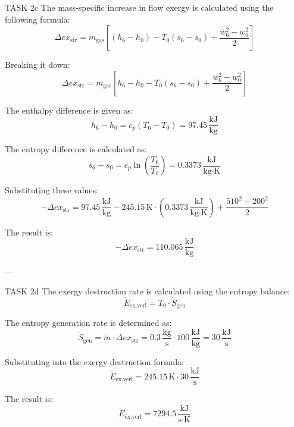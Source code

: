 TASK 2c  
The mass-specific increase in flow exergy is calculated using the following formula:  
\[
\Delta ex_{\text{str}} = \dot{m}_{\text{gas}} \left[ (h_6 - h_0) - T_0 (s_6 - s_0) + \frac{w_6^2 - w_0^2}{2} \right]
\]  

Breaking it down:  
\[
\Delta ex_{\text{str}} = \dot{m}_{\text{gas}} \left[ h_6 - h_0 - T_0 (s_6 - s_0) + \frac{w_6^2 - w_0^2}{2} \right]
\]  

The enthalpy difference is given as:  
\[
h_6 - h_0 = c_p (T_6 - T_0) = 97.45 \, \frac{\text{kJ}}{\text{kg}}
\]  

The entropy difference is calculated as:  
\[
s_6 - s_0 = c_p \ln \left( \frac{T_6}{T_0} \right) = 0.3373 \, \frac{\text{kJ}}{\text{kg·K}}
\]  

Substituting these values:  
\[
-\Delta ex_{\text{str}} = 97.45 \, \frac{\text{kJ}}{\text{kg}} - 245.15 \, \text{K} \cdot (0.3373 \, \frac{\text{kJ}}{\text{kg·K}}) + \frac{510^2 - 200^2}{2}
\]  

The result is:  
\[
-\Delta ex_{\text{str}} = 110.065 \, \frac{\text{kJ}}{\text{kg}}
\]  

---

TASK 2d  
The exergy destruction rate is calculated using the entropy balance:  
\[
\dot{E}_{\text{ex,verl}} = T_0 \cdot \dot{S}_{\text{gen}}
\]  

The entropy generation rate is determined as:  
\[
\dot{S}_{\text{gen}} = \dot{m} \cdot \Delta ex_{\text{str}} = 0.3 \, \frac{\text{kg}}{\text{s}} \cdot 100 \, \frac{\text{kJ}}{\text{kg}} = 30 \, \frac{\text{kJ}}{\text{s}}
\]  

Substituting into the exergy destruction formula:  
\[
\dot{E}_{\text{ex,verl}} = 245.15 \, \text{K} \cdot 30 \, \frac{\text{kJ}}{\text{s}}
\]  

The result is:  
\[
\dot{E}_{\text{ex,verl}} = 7294.5 \, \frac{\text{kJ}}{\text{s·K}}
\]